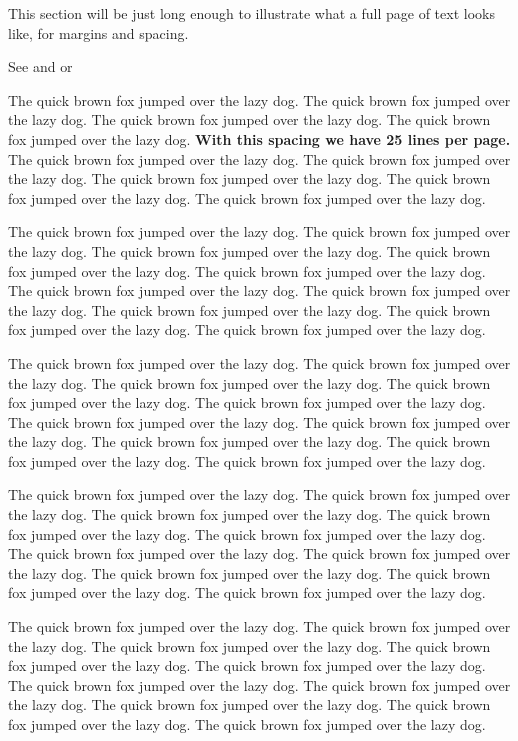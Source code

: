 \documentclass[12pt]{article}
\begin{document}
This section will be just long enough to illustrate what a full page of
text looks like, for margins and spacing.

\addtolength{\textheight}{.5in}%

See \citet{Campbell02} and \citet{Schubert13} or \citep{Chi81}

The quick brown fox jumped over the lazy dog. The quick brown fox jumped
over the lazy dog. The quick brown fox jumped over the lazy dog. The
quick brown fox jumped over the lazy dog. \textbf{With this spacing we
have 25 lines per page.} The quick brown fox jumped over the lazy dog.
The quick brown fox jumped over the lazy dog. The quick brown fox jumped
over the lazy dog. The quick brown fox jumped over the lazy dog. The
quick brown fox jumped over the lazy dog.

The quick brown fox jumped over the lazy dog. The quick brown fox jumped
over the lazy dog. The quick brown fox jumped over the lazy dog. The
quick brown fox jumped over the lazy dog. The quick brown fox jumped
over the lazy dog. The quick brown fox jumped over the lazy dog. The
quick brown fox jumped over the lazy dog. The quick brown fox jumped
over the lazy dog. The quick brown fox jumped over the lazy dog. The
quick brown fox jumped over the lazy dog.

The quick brown fox jumped over the lazy dog. The quick brown fox jumped
over the lazy dog. The quick brown fox jumped over the lazy dog. The
quick brown fox jumped over the lazy dog. The quick brown fox jumped
over the lazy dog. The quick brown fox jumped over the lazy dog. The
quick brown fox jumped over the lazy dog. The quick brown fox jumped
over the lazy dog. The quick brown fox jumped over the lazy dog. The
quick brown fox jumped over the lazy dog.

\addtolength{\textheight}{-.3in}%

The quick brown fox jumped over the lazy dog. The quick brown fox jumped
over the lazy dog. The quick brown fox jumped over the lazy dog. The
quick brown fox jumped over the lazy dog. The quick brown fox jumped
over the lazy dog. The quick brown fox jumped over the lazy dog. The
quick brown fox jumped over the lazy dog. The quick brown fox jumped
over the lazy dog. The quick brown fox jumped over the lazy dog. The
quick brown fox jumped over the lazy dog.

The quick brown fox jumped over the lazy dog. The quick brown fox jumped
over the lazy dog. The quick brown fox jumped over the lazy dog. The
quick brown fox jumped over the lazy dog. The quick brown fox jumped
over the lazy dog. The quick brown fox jumped over the lazy dog. The
quick brown fox jumped over the lazy dog. The quick brown fox jumped
over the lazy dog. The quick brown fox jumped over the lazy dog. The
quick brown fox jumped over the lazy dog.
\end{document}
